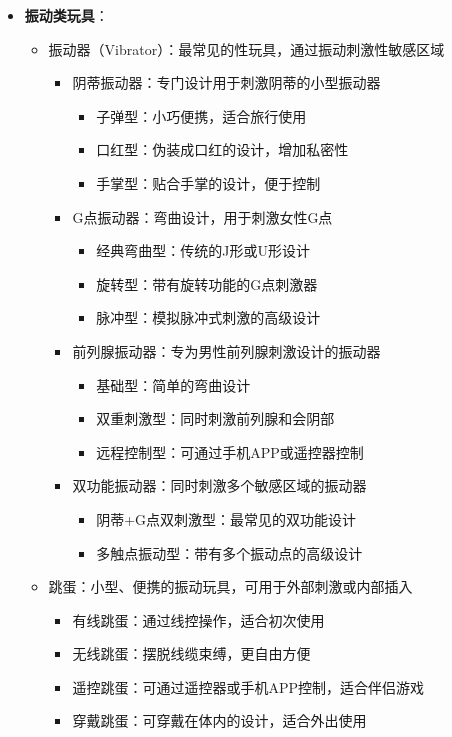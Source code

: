 \documentclass[12pt,UTF8]{ctexbook}
\begin{document}
\begin{itemize}
	\item \textbf{振动类玩具}：
	\begin{itemize}
		\item 振动器（Vibrator）：最常见的性玩具，通过振动刺激性敏感区域
		\begin{itemize}
			\item 阴蒂振动器：专门设计用于刺激阴蒂的小型振动器
			\begin{itemize}
				\item 子弹型：小巧便携，适合旅行使用
				\item 口红型：伪装成口红的设计，增加私密性
				\item 手掌型：贴合手掌的设计，便于控制
			\end{itemize}
			\item G点振动器：弯曲设计，用于刺激女性G点
			\begin{itemize}
				\item 经典弯曲型：传统的J形或U形设计
				\item 旋转型：带有旋转功能的G点刺激器
				\item 脉冲型：模拟脉冲式刺激的高级设计
			\end{itemize}
			\item 前列腺振动器：专为男性前列腺刺激设计的振动器
			\begin{itemize}
				\item 基础型：简单的弯曲设计
				\item 双重刺激型：同时刺激前列腺和会阴部
				\item 远程控制型：可通过手机APP或遥控器控制
			\end{itemize}
			\item 双功能振动器：同时刺激多个敏感区域的振动器
			\begin{itemize}
				\item 阴蒂+G点双刺激型：最常见的双功能设计
				\item 多触点振动型：带有多个振动点的高级设计
			\end{itemize}
		\end{itemize}
		\item 跳蛋：小型、便携的振动玩具，可用于外部刺激或内部插入
		\begin{itemize}
			\item 有线跳蛋：通过线控操作，适合初次使用
			\item 无线跳蛋：摆脱线缆束缚，更自由方便
			\item 遥控跳蛋：可通过遥控器或手机APP控制，适合伴侣游戏
			\item 穿戴跳蛋：可穿戴在体内的设计，适合外出使用

\end{itemize}
\end{itemize}
\end{itemize}
\end{document}
